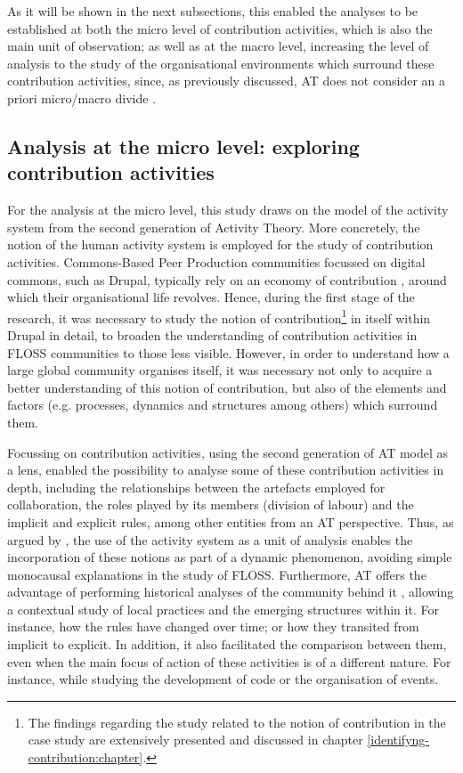 As it will be shown in the next subsections, this enabled the analyses to be established at both the micro level of contribution activities, which is also the main unit of observation; as well as at the macro level, increasing the level of analysis to the study of the organisational environments which surround these contribution activities, since, as previously discussed, AT does not consider an a priori micro/macro divide \parencite{miettinen1999riddle}.

\subsection{Analysis at the micro level: exploring contribution activities}

For the analysis at the micro level, this study draws on the model of the activity system from the second generation of Activity Theory. More concretely, the notion of the human activity system is employed for the study of contribution activities. Commons-Based Peer Production communities focussed on digital commons, such as Drupal, typically rely on an economy of contribution \parencite{wittel2013counter}, around which their organisational life revolves. Hence, during the first stage of the research, it was necessary to study the notion of contribution\footnote{The findings regarding the study related to the notion of contribution in the case study are extensively presented and discussed in chapter \ref{identifyng-contribution:chapter}.} in itself within Drupal in detail, to broaden the understanding of contribution activities in FLOSS communities to those less visible. However, in order to understand how a large global community organises itself, it was necessary not only to acquire a better understanding of this notion of contribution, but also of the elements and factors (e.g. processes, dynamics and structures among others) which surround them.

Focussing on contribution activities, using the second generation of AT model as a lens, enabled the possibility to analyse some of these contribution activities in depth, including the relationships between the artefacts employed for collaboration, the roles played by its members (division of labour) and the implicit and explicit rules, among other entities from an AT perspective. Thus, as argued by \textcite{Uden2007}, the use of the activity system as a unit of analysis enables the incorporation of these notions as part of a dynamic phenomenon, avoiding simple monocausal explanations in the study of FLOSS. Furthermore, AT offers the advantage of performing historical analyses of the community behind it \parencite{Uden2007}, allowing a contextual study of  local practices and the emerging structures within it. For instance, how the rules have changed over time; or how they transited from implicit to explicit. In addition, it also facilitated the comparison between them, even when the main focus of action of these activities is of a different nature. For instance, while studying the development of code or the organisation of events.

